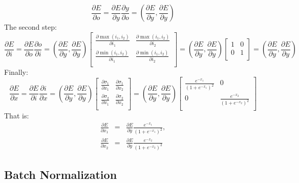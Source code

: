 \documentclass{article}
\begin{document}
$$
\frac{\partial E}{\partial o} =\frac{\partial E}{\partial y} \frac{\partial y}{\partial o}=(\frac{\partial E}{\partial y} ,\frac{\partial E}{\partial y} )
$$
The second step:
$$
\frac{\partial E}{\partial i} = \frac{\partial E}{\partial o} \frac{\partial o}{\partial i} =
(\frac{\partial E}{\partial y} ,\frac{\partial E}{\partial y} )
\begin{bmatrix}
 \frac{\partial\max(i_1,i_2)}{\partial i_1}     & \frac{\partial \max(i_1,i_2)}{\partial i_2}\\
\frac{\partial \min(i_1,i_2)}{\partial i_1}     & \frac{\partial \min(i_1,i_2)}{\partial i_2}   \\
\end{bmatrix}=
(\frac{\partial E}{\partial y} ,\frac{\partial E}{\partial y} )
\begin{bmatrix}
1 & 0\\
0 & 1  \\
\end{bmatrix}=(\frac{\partial E}{\partial y} ,\frac{\partial E}{\partial y} )
$$
Finally:
$$
\frac{\partial E}{\partial x}= \frac{\partial E}{\partial i} \frac{\partial i}{\partial x}=
(\frac{\partial E}{\partial y} ,\frac{\partial E}{\partial y} )
\begin{bmatrix}
\frac{\partial \sigma_1}{\partial x_1} & \frac{\partial \sigma_1}{\partial x_2}\\
\frac{\partial \sigma_2}{\partial x_1} & \frac{\partial \sigma_2}{\partial x_2} \\
\end{bmatrix}=
(\frac{\partial E}{\partial y} ,\frac{\partial E}{\partial y} )
\begin{bmatrix}
  \frac{e^{-x_1}}{{(1+e^{-x_1})}^2}&0\\
  0&\frac{e^{-x_2}}{{(1+e^{-x_2})}^2} \\
\end{bmatrix}
$$ 
That is:
\begin{eqnarray*}
  \frac{\partial E}{\partial x_1}&=&\frac{\partial E}{\partial y}\frac{e^{-x_1}}{{(1+e^{-x_1})}^2},\\
  \frac{\partial E}{\partial x_2}&=&\frac{\partial E}{\partial y}\frac{e^{-x_2}}{{(1+e^{-x_2})}^2}
\end{eqnarray*}

\subsection{Batch Normalization}
\end{document}

